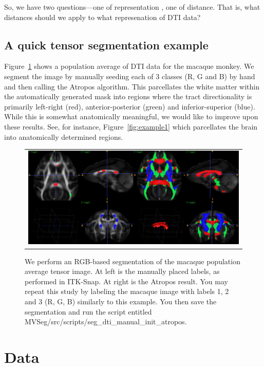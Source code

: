 \documentclass[11pt,english]{article}
\begin{document}
So, we have two questions---one of representation , one of distance.  That is,
what distances should we apply to what represenation of DTI data?


\subsection{A quick tensor segmentation example}
Figure~\ref{fig:macaque} shows a population average of DTI data for
the macaque monkey.  We segment the image by manually seeding each of
3 classes (R, G and B) by hand and then calling the Atropos
algorithm.  This parcellates the white matter within the automatically
generated mask into regions where the tract directionality is
primarily left-right (red), anterior-posterior (green) and
inferior-superior (blue).  While this is somewhat anatomically
meaningful, we would like to improve upon these results.  See, for
instance, Figure~\ref{fig:example1} which parcellates the brain into
anatomically determined regions.  
\begin{figure}
\begin{center}
\begin{tabular}{c}
\includegraphics[width=6in]{Figures/macaque_rgb.pdf}
\end{tabular}
\caption{We perform an RGB-based segmentation of the macaque
  population average tensor image.  At left is the manually placed
  labels, as performed in ITK-Snap.  At right is the Atropos result.
  You may repeat this study by labeling the macaque image with labels
  1, 2 and 3 (R, G, B) similarly to this example.  You then
  save the segmentation and run the script entitled MVSeg/src/scripts/seg\_dti\_manual\_init\_atropos.}
\label{fig:macaque}
\end{center}
\end{figure}



\section{Data}
\end{document}
